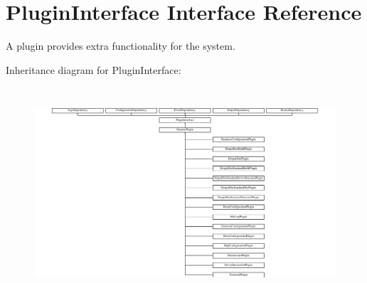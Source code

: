 \hypertarget{interfacePluginInterface}{\section{Plugin\-Interface Interface Reference}
\label{interfacePluginInterface}
}


A plugin provides extra functionality for the system.  


Inheritance diagram for Plugin\-Interface\-:\begin{figure}[H]
\begin{center}
\leavevmode
\includegraphics[height=7.875000cm]{interfacePluginInterface}
\end{center}
\end{figure}
